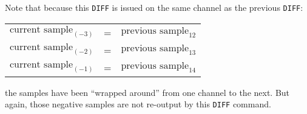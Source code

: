 \par
\noindent
Note that because this \texttt{DIFF} is issued on the same channel
as the previous \texttt{DIFF}:
\begin{table}[h]
\begin{tabular}{rcl}
  $\text{current sample}_{(-3)}$ & = & $\text{previous sample}_{12}$ \\
  $\text{current sample}_{(-2)}$ & = & $\text{previous sample}_{13}$ \\
  $\text{current sample}_{(-1)}$ & = & $\text{previous sample}_{14}$ \\
\end{tabular}
\end{table}
\par
\noindent
the samples have been ``wrapped around'' from one channel to the next.
But again, those negative samples are not re-output by
this \texttt{DIFF} command.





